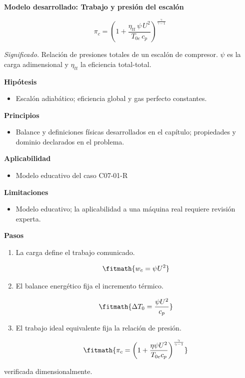 \documentclass[10pt,openany]{book}
\begin{document}
\begin{tcolorbox}[title={Desarrollos del modelo}, studiumdef, breakable]

\noindent\textbf{Modelo desarrollado: Trabajo y presión del escalón}

\begin{equation}
\pi_c=\left(1+\frac{\eta_{tt}\,\psi\,U^2}{T_{0e}\,c_p}\right)^{\frac{\gamma}{\gamma-1}}
\label{eq:EC-C07}
\end{equation}

\noindent\textit{Significado.} Relación de presiones totales de un escalón de compresor. $\psi$ es la carga adimensional y $\eta_{tt}$ la eficiencia total-total.

\noindent\textbf{Hipótesis}
\begin{itemize}
\item Escalón adiabático; eficiencia global y gas perfecto constantes.
\end{itemize}

\noindent\textbf{Principios}
\begin{itemize}
\item Balance y definiciones físicas desarrollados en el capítulo; propiedades y dominio declarados en el problema.
\end{itemize}

\noindent\textbf{Aplicabilidad}
\begin{itemize}
\item Modelo educativo del caso C07-01-R
\end{itemize}

\noindent\textbf{Limitaciones}
\begin{itemize}
\item Modelo educativo; la aplicabilidad a una máquina real requiere revisión experta.
\end{itemize}

\noindent\textbf{Pasos}
\begin{enumerate}
\item
La carga define el trabajo comunicado.

\[
\fitmath{w_c=\psi U^{2}}
\]
\item
El balance energético fija el incremento térmico.

\[
\fitmath{\Delta T_0=\frac{\psi U^{2}}{c_p}}
\]
\item
El trabajo ideal equivalente fija la relación de presión.

\[
\fitmath{\pi_c=\left(1 + \frac{\eta \psi U^{2}}{T_{0e} c_p}\right)^{\frac{\gamma}{\gamma - 1}}}
\]
\end{enumerate}

{\noindent\footnotesize verificada dimensionalmente.\par}
\end{tcolorbox}
\end{document}
